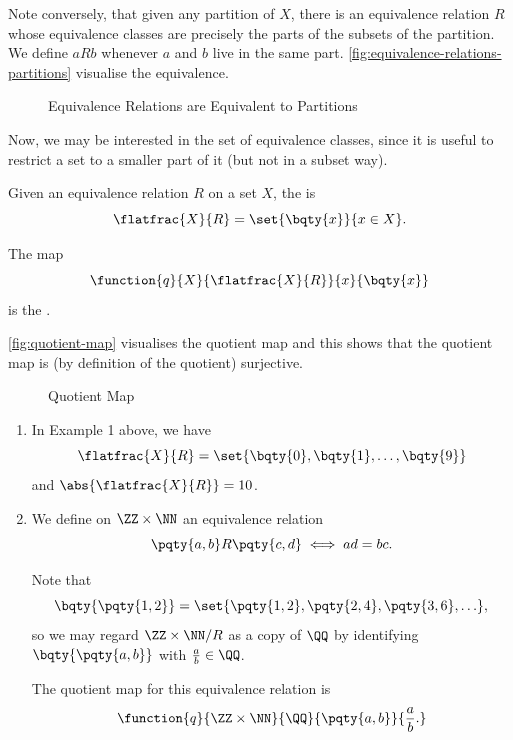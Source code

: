 Note conversely, that given any partition of \(X\), there is an equivalence relation \(R\) whose equivalence classes are precisely the parts of the subsets of the partition. We define \(aRb\) whenever \(a\) and \(b\) live in the same part. \autoref{fig:equivalence-relations-partitions} visualise the equivalence.

\begin{figure}[ht!]
    \centering
    \caption{Equivalence Relations are Equivalent to Partitions}
    \label{fig:equivalence-relations-partitions}
\end{figure}

Now, we may be interested in the set of equivalence classes, since it is useful to restrict a set to a smaller part of it (but not in a subset way).

\begin{definition}
    Given an equivalence relation \(R\) on a set \(X\), the  is
    \[
        \flatfrac{X}{R} = \set{\bqty{x}}{x \in X}.
    \]

    The map
    \[
        \function{q}{X}{\flatfrac{X}{R}}{x}{\bqty{x}}
    \]
    is the .
\end{definition}

\autoref{fig:quotient-map} visualises the quotient map and this shows that the quotient map is (by definition of the quotient) surjective.

\begin{figure}[ht!]
    \centering
    \caption{Quotient Map}
    \label{fig:quotient-map}
\end{figure}

\begin{examples}
    \begin{enumerate}
        \item In Example 1 above, we have
        \[
            \flatfrac{X}{R} = \set{\bqty{0}, \bqty{1}, \ldots, \bqty{9}}
        \]
        and \(\abs{\flatfrac{X}{R}} = 10\).

        \item We define on \(\ZZ \times \NN\) an equivalence relation
        \[
            \pqty{a, b} R \pqty{c, d} \iff ad = bc.
        \]

        Note that
        \[
            \bqty{\pqty{1, 2}} = \set{\pqty{1, 2}, \pqty{2, 4}, \pqty{3, 6}, \ldots},
        \]
        so we may regard \(\ZZ \times \NN / R\) as a copy of \(\QQ\) by identifying \(\bqty{\pqty{a, b}}\) with \(\frac{a}{b} \in \QQ\).

        The quotient map for this equivalence relation is
        \[
            \function{q}{\ZZ \times \NN}{\QQ}{\pqty{a, b}}{\frac{a}{b}.}
        \]
    \end{enumerate}
\end{examples}

